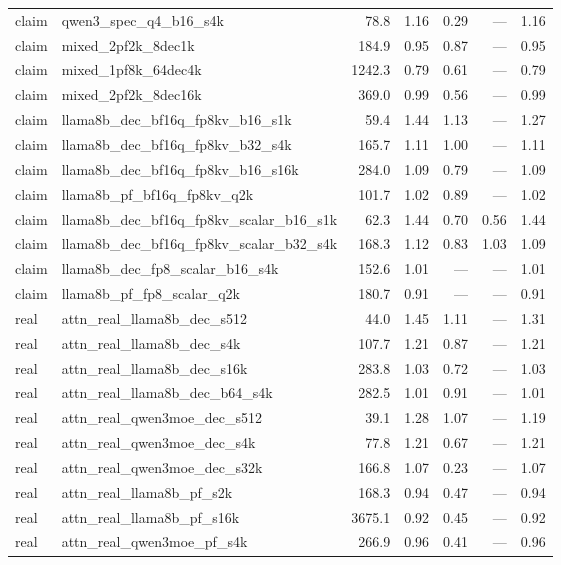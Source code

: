 \begin{longtable}{@{}llrrrrr@{}}
claim & qwen3\_spec\_q4\_b16\_s4k & 78.8 & 1.16 & 0.29 & --- & 1.16 \\
claim & mixed\_2pf2k\_8dec1k & 184.9 & 0.95 & 0.87 & --- & 0.95 \\
claim & mixed\_1pf8k\_64dec4k & 1242.3 & 0.79 & 0.61 & --- & 0.79 \\
claim & mixed\_2pf2k\_8dec16k & 369.0 & 0.99 & 0.56 & --- & 0.99 \\
claim & llama8b\_dec\_bf16q\_fp8kv\_b16\_s1k & 59.4 & 1.44 & 1.13 & --- & 1.27 \\
claim & llama8b\_dec\_bf16q\_fp8kv\_b32\_s4k & 165.7 & 1.11 & 1.00 & --- & 1.11 \\
claim & llama8b\_dec\_bf16q\_fp8kv\_b16\_s16k & 284.0 & 1.09 & 0.79 & --- & 1.09 \\
claim & llama8b\_pf\_bf16q\_fp8kv\_q2k & 101.7 & 1.02 & 0.89 & --- & 1.02 \\
claim & llama8b\_dec\_bf16q\_fp8kv\_scalar\_b16\_s1k & 62.3 & 1.44 & 0.70 & 0.56 & 1.44 \\
claim & llama8b\_dec\_bf16q\_fp8kv\_scalar\_b32\_s4k & 168.3 & 1.12 & 0.83 & 1.03 & 1.09 \\
claim & llama8b\_dec\_fp8\_scalar\_b16\_s4k & 152.6 & 1.01 & --- & --- & 1.01 \\
claim & llama8b\_pf\_fp8\_scalar\_q2k & 180.7 & 0.91 & --- & --- & 0.91 \\
real & attn\_real\_llama8b\_dec\_s512 & 44.0 & 1.45 & 1.11 & --- & 1.31 \\
real & attn\_real\_llama8b\_dec\_s4k & 107.7 & 1.21 & 0.87 & --- & 1.21 \\
real & attn\_real\_llama8b\_dec\_s16k & 283.8 & 1.03 & 0.72 & --- & 1.03 \\
real & attn\_real\_llama8b\_dec\_b64\_s4k & 282.5 & 1.01 & 0.91 & --- & 1.01 \\
real & attn\_real\_qwen3moe\_dec\_s512 & 39.1 & 1.28 & 1.07 & --- & 1.19 \\
real & attn\_real\_qwen3moe\_dec\_s4k & 77.8 & 1.21 & 0.67 & --- & 1.21 \\
real & attn\_real\_qwen3moe\_dec\_s32k & 166.8 & 1.07 & 0.23 & --- & 1.07 \\
real & attn\_real\_llama8b\_pf\_s2k & 168.3 & 0.94 & 0.47 & --- & 0.94 \\
real & attn\_real\_llama8b\_pf\_s16k & 3675.1 & 0.92 & 0.45 & --- & 0.92 \\
real & attn\_real\_qwen3moe\_pf\_s4k & 266.9 & 0.96 & 0.41 & --- & 0.96 \\
\end{longtable}
